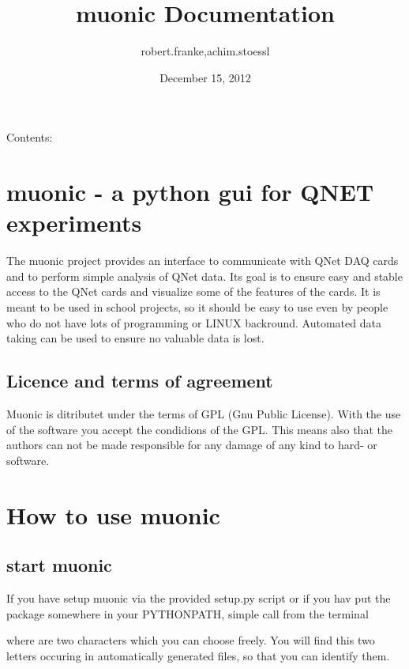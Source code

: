 \documentclass[letterpaper,10pt,english]{sphinxmanual}
\title{muonic Documentation}
\date{December 15, 2012}
\author{robert.franke,achim.stoessl}
\begin{document}
\maketitle
\tableofcontents
{}\label{index::doc}


Contents:


\chapter{muonic - a python gui for QNET experiments}
\label{intro:welcome-to-muonic-s-documentation}\label{intro::doc}\label{intro:muonic-a-python-gui-for-qnet-experiments}
The muonic project provides an interface to communicate with QNet DAQ cards and to perform simple analysis of QNet data.
Its goal is to ensure easy and stable access to the QNet cards and visualize some of the features of the cards. It is meant to be used in school projects, so it should be easy to use even by people who do not have lots of programming or LINUX backround. Automated data taking can be used to ensure no valuable data is lost.


\section{Licence and terms of agreement}
\label{intro:licence-and-terms-of-agreement}
Muonic is ditributet under the terms of GPL (Gnu Public License). With the use of the software you accept the condidions of the GPL. This means also that the authors can not be made responsible for any damage of any kind to hard- or software.


\chapter{How to use muonic}
\label{tutorial::doc}\label{tutorial:how-to-use-muonic}

\section{start muonic}
\label{tutorial:start-muonic}
If you have setup muonic via the provided setup.py script or if you hav put the package somewhere in your PYTHONPATH, simple call from the terminal


where  are two characters which you can choose freely. You will find this two letters occuring in automatically generated files, so that you can identify them.
\end{document}
